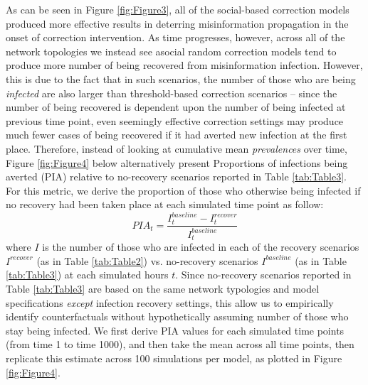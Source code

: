 \documentclass[man, 12pt, a4paper, nolmodern, noextraspace]{apa6}
\begin{document}
  As can be seen in Figure \ref{fig:Figure3}, all of the social-based correction models produced more effective results in deterring misinformation propagation in the onset of correction intervention. As time progresses, however, across all of the network topologies we instead see asocial random correction models tend to produce more number of being recovered from misinformation infection. However, this is due to the fact that in such scenarios, the number of those who are being \emph{infected} are also larger than threshold-based correction scenarios -- since the number of being recovered is dependent upon the number of being infected at previous time point, even seemingly effective correction settings may produce much fewer cases of being recovered if it had averted new infection at the first place. Therefore, instead of looking at cumulative mean \emph{prevalences} over time, Figure \ref{fig:Figure4} below alternatively present Proportions of infections being averted (PIA) relative to no-recovery scenarios reported in Table \ref{tab:Table3}. For this metric, we derive the proportion of those who otherwise being infected if no recovery had been taken place at each simulated time point as follow: 
\[ PIA_{t} = \frac{I_{t}^{baseline} - I_{t}^{recover}}{I_{t}^{baseline}} \] where $\mathit{I}$ is the number of those who are infected in each of the recovery scenarios $I^{recover}$ (as in Table \ref{tab:Table2}) vs. no-recovery scenarios $I^{baseline}$ (as in Table \ref{tab:Table3}) at each simulated hours $\mathit{t}$. Since no-recovery scenarios reported in Table \ref{tab:Table3} are based on the same network typologies and model specifications \emph{except} infection recovery settings, this allow us to empirically identify counterfactuals without hypothetically assuming number of those who stay being infected. We first derive PIA values for each simulated time points (from time 1 to time 1000), and then take the mean across all time points, then replicate this estimate across 100 simulations per model, as plotted in Figure \ref{fig:Figure4}.  
\end{document}
